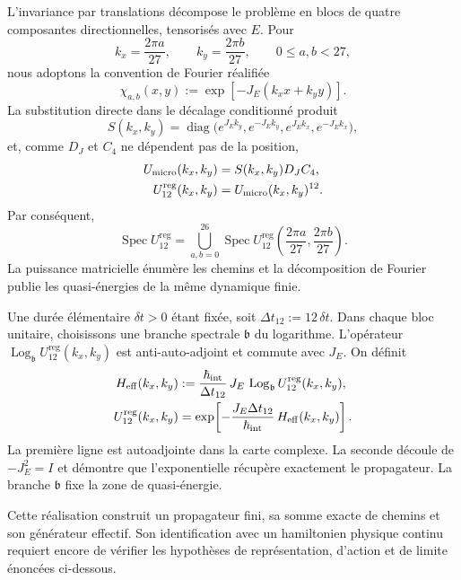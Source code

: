 L’invariance par translations décompose le problème en blocs de quatre
composantes directionnelles, tensorisés avec \(E\). Pour
\[
 k_x=\frac{2\pi a}{27},
 \qquad
 k_y=\frac{2\pi b}{27},
 \qquad 0\leq a,b<27,
\]
nous adoptons la convention de Fourier réalifiée
\[
 \chi_{a,b}(x,y)
 :=\exp[-J_E(k_xx+k_yy)].
\]
La substitution directe dans le décalage conditionné produit
\[
 S(k_x,k_y)
 =\operatorname{diag}
 \bigl(
  e^{J_Ek_y},e^{-J_Ek_y},
  e^{J_Ek_x},e^{-J_Ek_x}
 \bigr),
\]
et, comme \(D_J\) et \(C_4\) ne dépendent pas de la position,
\begin{equation}
 \begin{aligned}
 U_{\rm micro}(k_x,k_y)
   &=S(k_x,k_y)D_JC_4,\\
 U_{12}^{\mathrm{reg}}(k_x,k_y)
   &=U_{\rm micro}(k_x,k_y)^{12}.
 \end{aligned}
 \label{eq:bloques-fourier-registro-27-rev3}
\end{equation}
Par conséquent,
\[
 \operatorname{Spec}U_{12}^{\mathrm{reg}}
 =
 \bigcup_{a,b=0}^{26}
 \operatorname{Spec}
 U_{12}^{\mathrm{reg}}
 \left(\frac{2\pi a}{27},\frac{2\pi b}{27}\right).
\]
La puissance matricielle énumère les chemins et la décomposition de Fourier publie
les quasi-énergies de la même dynamique finie.


Une durée élémentaire \(\delta t>0\) étant fixée, soit
\(\Delta t_{12}:=12\,\delta t\). Dans chaque bloc unitaire, choisissons une branche
spectrale \(\mathfrak b\) du logarithme. L’opérateur
\(\operatorname{Log}_{\mathfrak b}U_{12}^{\mathrm{reg}}(k_x,k_y)\) est
anti-auto-adjoint et commute avec \(J_E\). On définit
\begin{equation}
 \begin{aligned}
 H_{\rm eff}(k_x,k_y)
 &:=
 \frac{\hbar_{\rm int}}{\Delta t_{12}}\,
 J_E\,
 \operatorname{Log}_{\mathfrak b}
 U_{12}^{\mathrm{reg}}(k_x,k_y),\\
 U_{12}^{\mathrm{reg}}(k_x,k_y)
 &=
 \exp\!\left[
  -\frac{J_E\Delta t_{12}}{\hbar_{\rm int}}\,
  H_{\rm eff}(k_x,k_y)
 \right].
 \end{aligned}
 \label{eq:hamiltoniano-efectivo-registro-27-rev3}
\end{equation}
La première ligne est autoadjointe dans la carte complexe. La seconde découle de \(-J_E^2=I\) et démontre que l'exponentielle récupère exactement le propagateur. La branche \(\mathfrak b\) fixe la zone de quasi-énergie.

Cette réalisation construit un propagateur fini, sa somme exacte de chemins et
son générateur effectif. Son identification avec un hamiltonien physique continu
requiert encore de vérifier les hypothèses de représentation, d’action et de limite
énoncées ci-dessous.

